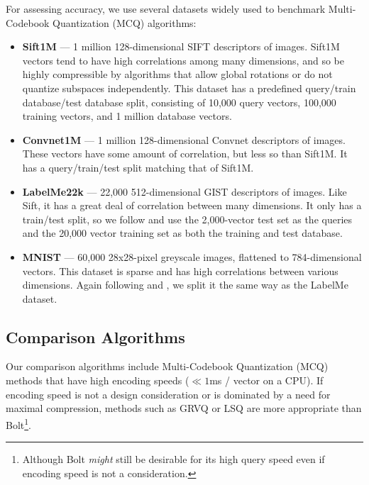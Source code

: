 For assessing accuracy, we use several datasets widely used to benchmark Multi-Codebook Quantization (MCQ) algorithms:
\begin{itemize}[leftmargin=4mm]
\item \textbf{Sift1M} \cite{pq} --- 1 million 128-dimensional SIFT descriptors of images. Sift1M vectors tend to have high correlations among many dimensions, and so be highly compressible by algorithms that allow global rotations or do not quantize subspaces independently. This dataset has a predefined query/train database/test database split, consisting of 10,000 query vectors, 100,000 training vectors, and 1 million database vectors.
\item \textbf{Convnet1M} \cite{stackedQuantizers} --- 1 million 128-dimensional Convnet descriptors of images. These vectors have some amount of correlation, but less so than Sift1M. It has a query/train/test split matching that of Sift1M.
\item \textbf{LabelMe22k} \cite{minimalLossHashing} --- 22,000 512-dimensional GIST descriptors of images. Like Sift, it has a great deal of correlation between many dimensions. It only has a train/test split, so we follow \cite{lsq, cq} and use the 2,000-vector test set as the queries and the 20,000 vector training set as both the training and test database.
\item \textbf{MNIST} \cite{mnist} --- 60,000 28x28-pixel greyscale images, flattened to 784-dimensional vectors. This dataset is sparse and has high correlations between various dimensions. Again following \cite{lsq} and \cite{cq}, we split it the same way as the LabelMe dataset.
\end{itemize}


\vspace{-2mm}
\subsection{Comparison Algorithms}

Our comparison algorithms include Multi-Codebook Quantization (MCQ) methods that have high encoding speeds ($\ll 1$ms / vector on a CPU). If encoding speed is not a design consideration or is dominated by a need for maximal compression, methods such as GRVQ \cite{grvq} or LSQ \cite{lsq} are more appropriate than Bolt\footnote{Although Bolt \textit{might} still be desirable for its high query speed even if encoding speed is not a consideration.}.

